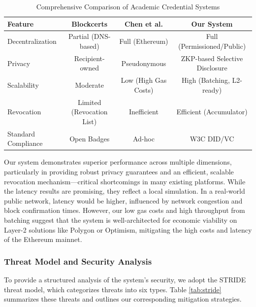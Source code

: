 \documentclass[lettersize,journal]{IEEEtran}
\begin{document}
\begin{itemize}
\begin{table}[!t]
\caption{Comprehensive Comparison of Academic Credential Systems\label{tab:comparison}}
\centering
\begin{tabular}{|l|c|c|c|}
\hline
\textbf{Feature} & \textbf{Blockcerts \cite{blockcerts}} & \textbf{Chen et al. \cite{chen2023}} & \textbf{Our System} \\
\hline
Decentralization & Partial (DNS-based) & Full (Ethereum) & Full (Permissioned/Public) \\
Privacy & Recipient-owned & Pseudonymous & ZKP-based Selective Disclosure \\
Scalability & Moderate & Low (High Gas Costs) & High (Batching, L2-ready) \\
Revocation & Limited (Revocation List) & Inefficient & Efficient (Accumulator) \\
Standard Compliance & Open Badges & Ad-hoc & W3C DID/VC \\
\hline
\end{tabular}
\end{table}

Our system demonstrates superior performance across multiple dimensions, particularly in providing robust privacy guarantees and an efficient, scalable revocation mechanism—critical shortcomings in many existing platforms. While the latency results are promising, they reflect a local simulation. In a real-world public network, latency would be higher, influenced by network congestion and block confirmation times. However, our low gas costs and high throughput from batching suggest that the system is well-architected for economic viability on Layer-2 solutions like Polygon or Optimism, mitigating the high costs and latency of the Ethereum mainnet.
\subsubsection{Threat Model and Security Analysis}
To provide a structured analysis of the system's security, we adopt the STRIDE threat model, which categorizes threats into six types. Table \ref{tab:stride} summarizes these threats and outlines our corresponding mitigation strategies.


\end{itemize}
\end{document}
